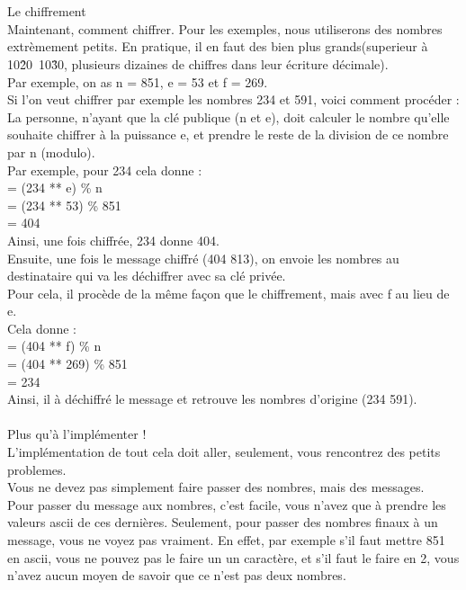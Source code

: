 \documentclass[12pt]{article}
\begin{document}
\\\\
Le chiffrement\\
Maintenant, comment chiffrer. Pour les exemples, nous utiliserons des nombres extrèmement petits. En pratique, il en faut des bien plus grands(superieur à 10\^20~10\^30, plusieurs dizaines de chiffres dans leur écriture décimale).\\
Par exemple, on as n = 851, e = 53 et f = 269.\\
Si l'on veut chiffrer par exemple les nombres 234 et 591, voici comment procéder :\\
La personne, n'ayant que la clé publique (n et e), doit calculer le nombre qu'elle souhaite chiffrer à la puissance e, et prendre le reste de la division de ce nombre par n (modulo).\\
Par exemple, pour 234 cela donne :\\
= (234 ** e) \% n\\
= (234 ** 53) \% 851\\
= 404\\
Ainsi, une fois chiffrée, 234 donne 404.\\
Ensuite, une fois le message chiffré (404 813), on envoie les nombres au destinataire qui va les déchiffrer avec sa clé privée.\\
Pour cela, il procède de la même façon que le chiffrement, mais avec f au lieu de e.\\
Cela donne :\\
= (404 ** f) \% n\\
= (404 ** 269) \% 851\\
= 234\\
Ainsi, il à déchiffré le message et retrouve les nombres d'origine (234 591).
\\\\
Plus qu'à l'implémenter !\\
L'implémentation de tout cela doit aller, seulement, vous rencontrez des petits problemes.\\
Vous ne devez pas simplement faire passer des nombres, mais des messages.\\
Pour passer du message aux nombres, c'est facile, vous n'avez que à prendre les valeurs ascii de ces dernières. Seulement, pour passer des nombres finaux à un message, vous ne voyez pas vraiment. En effet, par exemple s'il faut mettre 851 en ascii, vous ne pouvez pas le faire un un caractère, et s'il faut le faire en 2, vous n'avez aucun moyen de savoir que ce n'est pas deux nombres.\\
\end{document}
